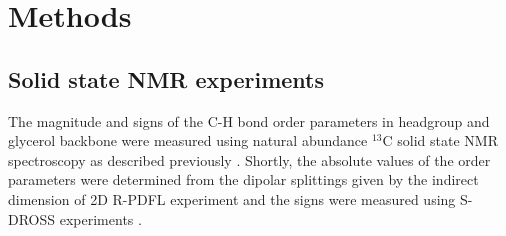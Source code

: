 \documentclass[aps,prl,superscriptaddress,twocolumn]{revtex4}
\begin{document}





\section{Methods}

\subsection{Solid state NMR experiments}
The magnitude and signs of the C-H bond order parameters in
headgroup and glycerol backbone were measured
using natural abundance $^{13}$C solid state NMR spectroscopy as
described previously \cite{ferreira13,ferreira16}.
Shortly, the absolute values of the order parameters were determined from the dipolar splittings
given by the indirect dimension of 2D R-PDFL experiment \cite{dvinskikh04} and
the signs were measured using S-DROSS experiments \cite{gross97}.
\end{document}
